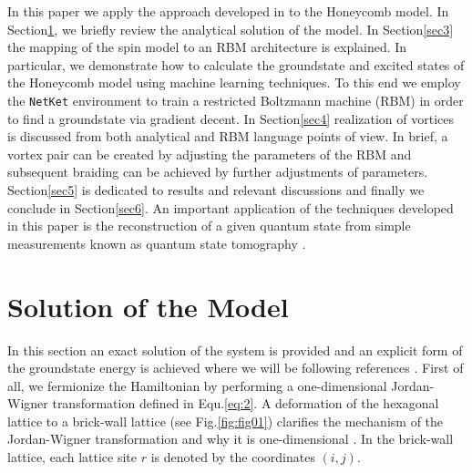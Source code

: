 \documentclass{article}
\begin{document}
In this paper we apply the approach developed in \cite{Deng_2017} to the Honeycomb model. In Section\hspace{0.2mm}\ref{sec2}, we briefly review the analytical solution of the model. In Section\hspace{0.2mm}\ref{sec3} the mapping of the spin model to an RBM architecture is explained. In particular, we demonstrate how to calculate the groundstate and excited states of the Honeycomb model using machine learning techniques. To this end we employ the \texttt{NetKet} environment \cite{netket:2019} to train a restricted Boltzmann machine (RBM) in order to find a groundstate via gradient decent. In Section\hspace{0.2mm}\ref{sec4} realization of vortices is discussed from both analytical and RBM language points of view. In brief, a vortex pair can be created by adjusting the parameters of the RBM and subsequent braiding can be achieved by further adjustments of parameters. Section\hspace{0.2mm}\ref{sec5} is dedicated to results and relevant discussions and finally we conclude in Section\hspace{0.2mm}\ref{sec6}. An important application of the techniques developed in this paper is the reconstruction of a given quantum state from simple measurements known as quantum state tomography \cite{Torlai_2018}.






\section{Solution of the Model}\label{sec2}

In this section an exact solution of the system is provided and an explicit form of the groundstate energy is achieved where we will be following references \cite{Kitaev_2006,pachos_2012}. First of all, we fermionize the Hamiltonian by performing a one-dimensional Jordan-Wigner transformation \cite{Jordan:1928wi} defined in Equ.\hspace{0.2mm}\ref{eq:2}. A deformation of the hexagonal lattice to a brick-wall lattice (see Fig.\hspace{0.2mm}\ref{fig:fig01})  clarifies the mechanism of the Jordan-Wigner transformation and why it is one-dimensional \cite{Chen_2008}. In the brick-wall lattice, each lattice site $r$ is denoted by the coordinates $(i,j)$.
\end{document}

